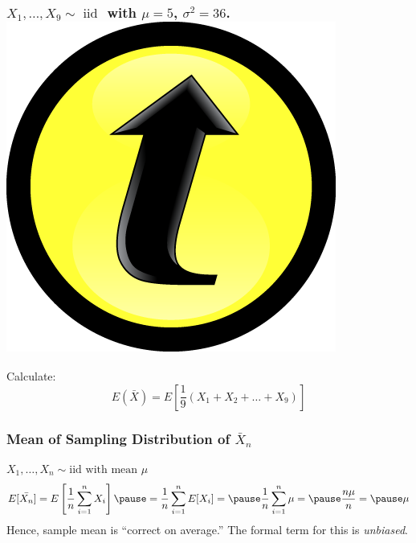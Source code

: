 \documentclass[handout]{beamer}
\begin{document}
\begin{frame}
\frametitle{$X_1,\hdots, X_{9} \sim \mbox{ iid }$ with $\mu=5$, $\sigma^2 =36$. \hfill\includegraphics[scale = 0.05]{./images/clicker}}

\large Calculate:
	 $$E(\bar{X}) = E\left[\frac{1}{9}(X_1 + X_2 + \hdots + X_{9})\right]$$
\end{frame}
\begin{frame}
\frametitle{Mean of Sampling Distribution of $\bar{X}_n$}
\alert{$X_1, \hdots, X_n \sim \mbox{iid with mean }\mu$}
\begin{eqnarray*}
E[\bar{X_n}] = E\left[ \frac{1}{n}\sum_{i=1}^n X_i \right]\pause = \frac{1}{n} \sum_{i=1}^n E[X_i] = \pause\frac{1}{n} \sum_{i=1}^n \mu = \pause \frac{n\mu}{n} =\pause \mu
\end{eqnarray*}
\pause \alert{Hence, sample mean is ``correct on average.'' The formal term for this is \emph{unbiased}.}
\end{frame}
\end{document}
